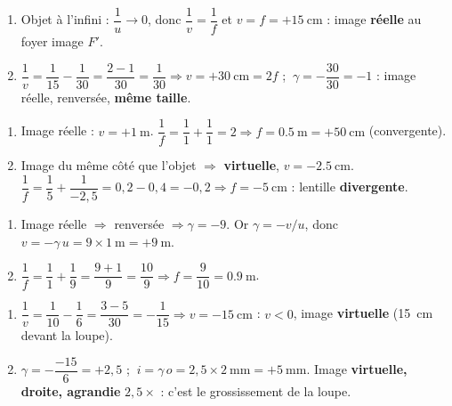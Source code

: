 \documentclass[11pt,a4paper]{article}
\begin{document}

\begin{corrige}
\begin{enumerate}[label=\alph*)]
  \item Objet à l'infini : $\dfrac{1}{u}\to 0$, donc $\dfrac{1}{v}=\dfrac{1}{f}$ et
        $v=f=+\qty{15}{\cm}$ : image \textbf{réelle} au foyer image $F'$.
  \item $\dfrac{1}{v}=\dfrac{1}{15}-\dfrac{1}{30}=\dfrac{2-1}{30}=\dfrac{1}{30}\Rightarrow v=+\qty{30}{\cm}=2f$ ;
        $\ \gamma=-\dfrac{30}{30}=-1$ : image réelle, renversée, \textbf{même taille}.
\end{enumerate}
\end{corrige}

\begin{corrige}
\begin{enumerate}[label=\alph*)]
  \item Image réelle : $v=+\qty{1}{\m}$. $\dfrac{1}{f}=\dfrac{1}{1}+\dfrac{1}{1}=2\Rightarrow
        f=\qty{0.5}{\m}=+\qty{50}{\cm}$ (convergente).
  \item Image du même côté que l'objet $\Rightarrow$ \textbf{virtuelle}, $v=-\qty{2.5}{\cm}$.
        $\dfrac{1}{f}=\dfrac{1}{5}+\dfrac{1}{-2{,}5}=0{,}2-0{,}4=-0{,}2\Rightarrow f=-\qty{5}{\cm}$ :
        lentille \textbf{divergente}.
\end{enumerate}
\end{corrige}

\begin{corrige}
\begin{enumerate}[label=\alph*)]
  \item Image réelle $\Rightarrow$ renversée $\Rightarrow \gamma=-9$. Or $\gamma=-v/u$, donc
        $v=-\gamma\,u=9\times\qty{1}{\m}=+\qty{9}{\m}$.
  \item $\dfrac{1}{f}=\dfrac{1}{1}+\dfrac{1}{9}=\dfrac{9+1}{9}=\dfrac{10}{9}\Rightarrow
        f=\dfrac{9}{10}=\qty{0.9}{\m}$.
\end{enumerate}
\end{corrige}

\begin{corrige}
\begin{enumerate}[label=\alph*)]
  \item $\dfrac{1}{v}=\dfrac{1}{10}-\dfrac{1}{6}=\dfrac{3-5}{30}=-\dfrac{1}{15}\Rightarrow v=-\qty{15}{\cm}$ :
        $v<0$, image \textbf{virtuelle} (\qty{15}{\cm} devant la loupe).
  \item $\gamma=-\dfrac{-15}{6}=+2{,}5$ ; $\ i=\gamma\,o=2{,}5\times\qty{2}{\mm}=+\qty{5}{\mm}$.
        Image \textbf{virtuelle, droite, agrandie} $2{,}5\times$ : c'est le grossissement de la loupe.
\end{enumerate}
\end{corrige}
\end{document}
